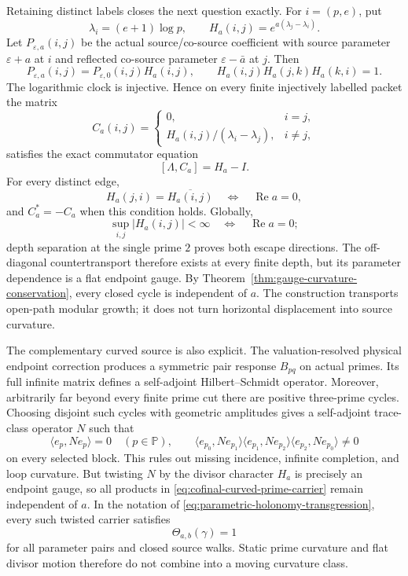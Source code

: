\documentclass[11pt]{article}
\theoremstyle{definition}
\theoremstyle{remark}
\newcommand{\Rea}{\operatorname{Re}}
\begin{document}
Retaining distinct labels closes the next question exactly.  For
\(i=(p,e)\), put
\[
                 \lambda_i=(e+1)\log p,\qquad
 H_a(i,j)=e^{a(\lambda_j-\lambda_i)}.
\tag{3.7zh0}\label{eq:joint-depth-edge-character}
\]
Let \(P_{\varepsilon,a}(i,j)\) be the actual source/co-source coefficient
with source parameter \(\varepsilon+a\) at \(i\) and reflected co-source
parameter \(\varepsilon-\bar a\) at \(j\).  Then
\[
 P_{\varepsilon,a}(i,j)
   =P_{\varepsilon,0}(i,j)H_a(i,j),
 \qquad
 H_a(i,j)H_a(j,k)H_a(k,i)=1.
\tag{3.7zh1}\label{eq:joint-depth-flat-incidence}
\]
The logarithmic clock is injective.  Hence on every finite injectively
labelled packet the matrix
\[
 C_a(i,j)=
 \begin{cases}
 0,&i=j,\\[2pt]
 H_a(i,j)/(\lambda_i-\lambda_j),&i\ne j,
 \end{cases}
\]
satisfies the exact commutator equation
\[
                  [\Lambda,C_a]=H_a-I.
\tag{3.7zh2}\label{eq:joint-depth-countertransport}
\]
For every distinct edge,
\[
 H_a(j,i)=\overline{H_a(i,j)}
       \quad\Longleftrightarrow\quad \Rea a=0,
\tag{3.7zh3}\label{eq:joint-depth-hodge-edge}
\]
and \(C_a^*=-C_a\) when this condition holds.  Globally,
\[
 \sup_{i,j}|H_a(i,j)|<\infty
       \quad\Longleftrightarrow\quad \Rea a=0;
\tag{3.7zh4}\label{eq:joint-depth-capacity-wall}
\]
depth separation at the single prime \(2\) proves both escape directions.
The off-diagonal countertransport therefore exists at every finite depth,
but its parameter dependence is a flat endpoint gauge.  By
Theorem~\ref{thm:gauge-curvature-conservation}, every closed cycle is
independent of \(a\).  The construction transports open-path modular growth;
it does not turn horizontal displacement into source curvature.

The complementary curved source is also explicit.  The valuation-resolved
physical endpoint correction produces a symmetric pair response
\(B_{pq}\) on actual primes.  Its full infinite matrix defines a
self-adjoint Hilbert--Schmidt operator.  Moreover, arbitrarily far beyond
every finite prime cut there are positive three-prime cycles.  Choosing
disjoint such cycles with geometric amplitudes gives a self-adjoint
trace-class operator \(N\) such that
\[
 \langle e_p,Ne_p\rangle=0\quad(p\in\mathbb P),
 \qquad
 \langle e_{p_0},Ne_{p_1}\rangle
 \langle e_{p_1},Ne_{p_2}\rangle
 \langle e_{p_2},Ne_{p_0}\rangle\ne0
\tag{3.7zh5}\label{eq:cofinal-curved-prime-carrier}
\]
on every selected block.  This rules out missing incidence, infinite
completion, and loop curvature.  But twisting \(N\) by the divisor character
\(H_a\) is precisely an endpoint gauge, so all products in
\eqref{eq:cofinal-curved-prime-carrier} remain independent of \(a\).  In the
notation of \eqref{eq:parametric-holonomy-transgression}, every such twisted
carrier satisfies
\[
                    \Theta_{a,b}(\gamma)=1
\tag{3.7zh5a}\label{eq:twisted-curvature-transgression-trivial}
\]
for all parameter pairs and closed source walks.  Static prime curvature and
flat divisor motion therefore do not combine into a moving curvature class.
\end{document}
